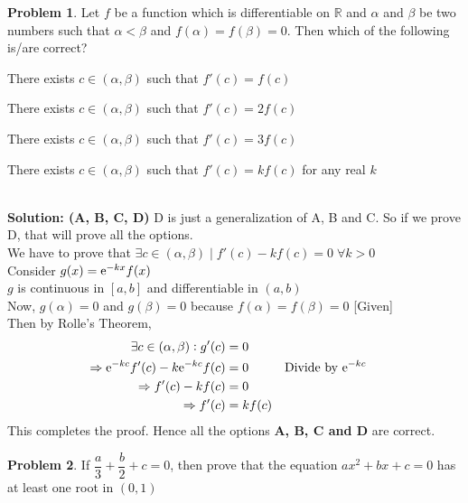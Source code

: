 \documentclass[14]{article}
\theoremstyle{definition}
\newtheorem{prob}{Problem}
\begin{document}
\pagebreak
\begin{prob}
Let $f$ be a function which is differentiable on $\mathbb{R}$ and $\alpha$ and $\beta$ be two numbers such that $\alpha < \beta$ and $f(\alpha) = f(\beta) = 0$. Then which of the following is/are correct?\\
\begin{enumerate*}[label=(\Alph*)]
\item There exists $c \in (\alpha, \beta)$ such that $f'(c) = f(c)$\\
\item There exists $c \in (\alpha, \beta)$ such that $f'(c) = 2f(c)$\\
\item There exists $c \in (\alpha, \beta)$ such that $f'(c) = 3f(c)$\\
\item There exists $c \in (\alpha, \beta)$ such that $f'(c) = kf(c)$ for any real $k$\\
\end{enumerate*}\\
\textbf{Solution: (A, B, C, D) } D is just a generalization of A, B and C. So if we prove D, that will prove all the options.\\
We have to prove that $\exists c \in (\alpha, \beta) \mid f'(c) - kf(c) = 0 \;\forall k > 0$\\
Consider $g(x) = {\rm e}^{-kx} f(x)$\\
$g$ is continuous in $[a, b]$ and differentiable in $(a, b)$\\
Now, $g(\alpha) = 0$ and $g(\beta) = 0$ because $f(\alpha) = f(\beta) = 0$ [Given]\\
Then by Rolle's Theorem,
\begin{align*}
\exists c \in (\alpha, \beta) : g'(c) &= 0\\
\Rightarrow {\rm e}^{-kc} f'(c) - k{\rm e}^{-kc}f(c) &= 0 && \text{Divide by } {\rm e}^{-kc}\\
\Rightarrow f'(c) - k f(c) &= 0\\
\Rightarrow f'(c) &= kf(c)
\end{align*}
This completes the proof. Hence all the options \textbf{A, B, C and D} are correct.
\end{prob}
\begin{prob}
If $\dfrac{a}{3} + \dfrac{b}{2} + c = 0$, then prove that the equation $ax^2 + bx + c = 0$ has at least one root in $(0, 1)$
\end{prob}
\end{document}
